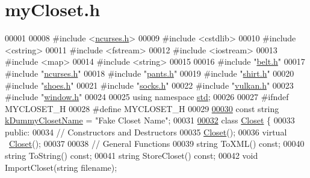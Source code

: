 \hypertarget{myCloset_8h_source}{}\section{my\+Closet.\+h}

\begin{DoxyCode}
00001 
00008 \textcolor{preprocessor}{#include <\mbox{\hyperlink{ncurses_8h}{ncurses.h}}>}
00009 \textcolor{preprocessor}{#include <cstdlib>}
00010 \textcolor{preprocessor}{#include <cstring>}
00011 \textcolor{preprocessor}{#include <fstream>}
00012 \textcolor{preprocessor}{#include <iostream>}
00013 \textcolor{preprocessor}{#include <map>}
00014 \textcolor{preprocessor}{#include <string>}
00015 
00016 \textcolor{preprocessor}{#include "\mbox{\hyperlink{belt_8h}{belt.h}}"}
00017 \textcolor{preprocessor}{#include "\mbox{\hyperlink{ncurses_8h}{ncurses.h}}"}
00018 \textcolor{preprocessor}{#include "\mbox{\hyperlink{pants_8h}{pants.h}}"}
00019 \textcolor{preprocessor}{#include "\mbox{\hyperlink{shirt_8h}{shirt.h}}"}
00020 \textcolor{preprocessor}{#include "\mbox{\hyperlink{shoes_8h}{shoes.h}}"}
00021 \textcolor{preprocessor}{#include "\mbox{\hyperlink{socks_8h}{socks.h}}"}
00022 \textcolor{preprocessor}{#include "\mbox{\hyperlink{vulkan_8h}{vulkan.h}}"}
00023 \textcolor{preprocessor}{#include "\mbox{\hyperlink{window_8h}{window.h}}"}
00024 
00025 \textcolor{keyword}{using namespace }\mbox{\hyperlink{namespacestd}{std}};
00026 
00027 \textcolor{preprocessor}{#ifndef MYCLOSET\_H}
00028 \textcolor{preprocessor}{#define MYCLOSET\_H}
00029 
\mbox{\hyperlink{myCloset_8h_abe246d8af0c0b6020aa175c2874b59be}{00030}} \textcolor{keyword}{const} \textcolor{keywordtype}{string} \mbox{\hyperlink{myCloset_8h_abe246d8af0c0b6020aa175c2874b59be}{kDummyClosetName}} = \textcolor{stringliteral}{"Fake Closet Name"};
00031 
\mbox{\hyperlink{classCloset}{00032}} \textcolor{keyword}{class }\mbox{\hyperlink{classCloset}{Closet}} \{
00033  \textcolor{keyword}{public}:
00034   \textcolor{comment}{// Constructors and Destructors}
00035   \mbox{\hyperlink{classCloset}{Closet}}();
00036   \textcolor{keyword}{virtual} ~\mbox{\hyperlink{classCloset}{Closet}}();
00037 
00038   \textcolor{comment}{// General Functions}
00039   \textcolor{keywordtype}{string} ToXML() \textcolor{keyword}{const};
00040   \textcolor{keywordtype}{string} ToString() \textcolor{keyword}{const};
00041   \textcolor{keywordtype}{string} StoreCloset() \textcolor{keyword}{const};
00042   \textcolor{keywordtype}{void} ImportCloset(\textcolor{keywordtype}{string} filename);

\end{DoxyCode}

